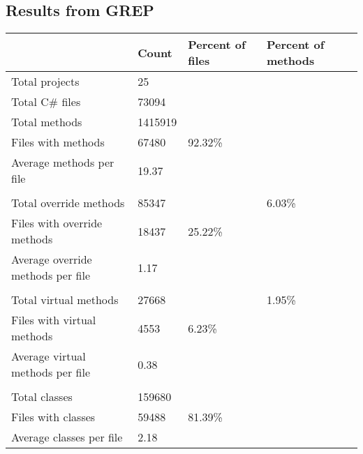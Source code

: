 {\subsection{Results from GREP}
\begin{center}
	\label{CsResults}
	\begin{tabular}{|l|l|l|l|}
		\hline
		& Count   & Percent of files & Percent of methods \\ \hline
		Total projects                       & 25      &                  &                    \\ \hline
		Total C\# files                      & 73094   &                  &                    \\ \hline
		Total methods                        & 1415919 &                  &                    \\ \hline
		Files with methods                   & 67480   & 92.32\%          &                    \\ \hline
		Average methods per file             & 19.37   &                  &                    \\ \hline
		&         &                  &                    \\ \hline
		Total override methods               & 85347   &                  & 6.03\%             \\ \hline
		Files with override methods          & 18437   & 25.22\%          &                    \\ \hline
		Average override methods per file    & 1.17    &                  &                    \\ \hline
		&         &                  &                    \\ \hline
		Total virtual methods                & 27668   &                  & 1.95\%             \\ \hline
		Files with virtual methods           & 4553    & 6.23\%           &                    \\ \hline
		Average virtual methods per file     & 0.38    &                  &                    \\ \hline
		&         &                  &                    \\ \hline
		Total classes                        & 159680  &                  &                    \\ \hline
		Files with classes                   & 59488   & 81.39\%          &                    \\ \hline
		Average classes per file             & 2.18    &                  &                    \\ \hline

\end{tabular}
\end{center}}
